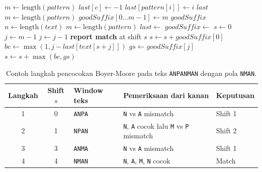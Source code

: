 \begin{tcolorbox}[breakable,title={Pseudocode Algoritma Boyer-Moore}]
    \begin{algorithmic}[1]
        \State $m \gets \text{length}(pattern)$
        \State $last[c] \gets -1$
        \EndFor
        \State $last[pattern[i]] \gets i$
        \EndFor
        \State \Return $last$
        \EndProcedure
        \Statex
        \State $m \gets \text{length}(pattern)$
        \State $goodSuffix[0 \dots m-1] \gets m$
        \State \Return $goodSuffix$
        \EndProcedure
        \Statex
        \State $n \gets \text{length}(text)$
        \State $m \gets \text{length}(pattern)$
        \State $last \gets$ 
        \State $goodSuffix \gets$ 
        \State $s \gets 0$
        \State $j \gets m - 1$
        \State $j \gets j - 1$
        \EndWhile
        \State \textbf{report match} at shift $s$
        \State $s \gets s + goodSuffix[0]$
        \Else
        \State $bc \gets \max(1, j - last[text[s + j]])$
        \State $gs \gets goodSuffix[j]$
        \State $s \gets s + \max(bc, gs)$
        \EndIf
        \EndWhile
        \EndProcedure
    \end{algorithmic}
\end{tcolorbox}

\begin{table}[H]
    \centering
    \caption{Contoh langkah pencocokan Boyer-Moore pada teks \texttt{ANPANMAN} dengan pola \texttt{NMAN}.}
    \small
    \setlength{\tabcolsep}{4pt}
    \begin{tabularx}{\textwidth}{c c >{\raggedright\arraybackslash}p{2.2cm} >{\raggedright\arraybackslash}X >{\raggedright\arraybackslash}p{2.7cm}}
        \toprule
        Langkah & Shift $s$ & Window teks   & Pemeriksaan dari kanan                                              & Keputusan \\
        \midrule
        1       & 0         & \texttt{ANPA} & \texttt{N} vs \texttt{A} mismatch                                   & Shift 1   \\
        2       & 1         & \texttt{NPAN} & \texttt{N}, \texttt{A} cocok lalu \texttt{M} vs \texttt{P} mismatch & Shift 2   \\
        3       & 3         & \texttt{ANMA} & \texttt{N} vs \texttt{A} mismatch                                   & Shift 1   \\
        4       & 4         & \texttt{NMAN} & \texttt{N}, \texttt{A}, \texttt{M}, \texttt{N} cocok                & Match     \\
        \bottomrule
    \end{tabularx}
\end{table}

